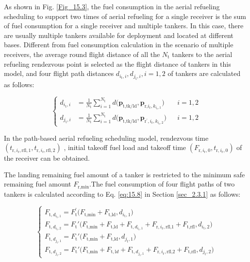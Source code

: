 As shown in Fig. \ref{Fig_15.3}, the fuel consumption in the aerial refueling scheduling to support two times of aerial refueling for a single receiver is the sum of fuel consumption for a single receiver and multiple tankers. In this case, there are usually multiple tankers available for deployment and located at different bases. Different from fuel consumption calculation in the scenario of multiple receivers, the average round flight distance of all the $N_\text{t}$ tankers to the aerial refueling rendezvous point is selected as the flight distance of tankers in this model, and four flight path distances $d_{i_{\text{t}},i},d_{j_{\text{t}},i},i=1,2$ of tankers are calculated as follows:

\begin{equation}
\left.\left\{\begin{aligned}d_{i_\text{t},i}&=\frac{1}{N_\text{t}}\sum_{i=1}^{N_\text{t}}d\big(\mathbf{p}_{\text{t,tk/ld}},\mathbf{p}_{\text{r,}i_\text{r},k_{i_\text{r},1}}\big)&&i=1,2\\d_{j_\text{t},i}&=\frac{1}{N_\text{t}}\sum_{i=1}^{N_\text{t}}d\big(\mathbf{p}_{\text{t,tk/ld}},\mathbf{p}_{\text{r}^{'},i_\text{r},k_{i_\text{r},2}}\big)&&i=1,2\end{aligned}\right.\right.
\label{eq:15.34}
\end{equation}

In the path-based aerial refueling scheduling model, rendezvous time $\left(t_{\text{r},i_{\text{r}},\text{rfl},1},t_{\text{r},i_{\text{r}},\text{rfl},2}\right)$ , initial takeoff fuel load and takeoff time  $\left(F_{\text{r},i_\text{r},0},t_{\text{r},i_\text{r},0}\right)$ of the receiver can be obtained.

The landing remaining fuel amount of a tanker is restricted to the minimum safe remaining fuel amount $F_{\text{r},\text{min}}$.The fuel consumption of four flight paths of two tankers is calculated according to Eq. \ref{eq:15.8} in Section \ref{sec_2.3.1} as follows:

\begin{equation}
\begin{cases}F_{\text{t},d_{i_\text{t},1}}=F_{\text{t}}^{'}\Big(F_{\text{t},\text{min}}+F_{\text{t},\text{ld}},d_{i_\text{t},1}\Big)\\
F_{\text{t},d_{i_\text{t},2}}=F_{\text{t}}'\Big(F_{\text{t},\text{min}}+F_{\text{t},\text{ld}}+F_{\text{t},d_{i_\text{t},1}}+F_{\text{r},i_\text{r},\text{rfl,1}}+F_{\text{t},\text{rfl}},d_{i_\text{t},2}\Big)
\\F_{\text{t},d_{j_\text{t},1}}=F_{\text{t}}'\Big(F_{\text{t},\text{min}}+F_{\text{t},\text{ld}},d_{j_\text{t},1}\Big)
\\F_{\text{t},d_{j_\text{t},2}}=F_{\text{t}}'\Big(F_{\text{t},\text{min}}+F_{\text{t},\text{l}d}+F_{\text{t},d_{j_\text{t},1}}+F_{\text{r},i_\text{r},\text{rfl,2}}+F_{\text{t},\text{rfl}},d_{j_\text{t},2}\Big)\end{cases}
\label{eq:15.35}
\end{equation}

